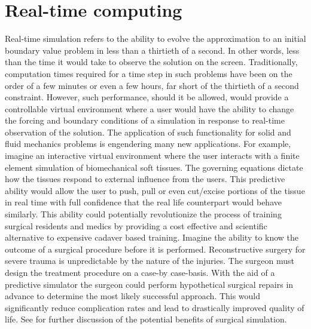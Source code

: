 \section*{Real-time computing}
Real-time simulation refers to the ability to evolve the approximation to an initial boundary value problem in less than a thirtieth of a second. In other words, less than the time it would take to observe the solution on the screen. Traditionally, computation times required for a time step in such problems have been on the order of a few minutes or even a few hours, far short of the thirtieth of a second constraint. However, such performance, should it be allowed, would provide a controllable virtual environment where a user would have the ability to change the forcing and boundary conditions of a simulation in response to real-time observation of the solution. The application of such functionality for solid and fluid mechanics problems is engendering many new applications. For example, imagine an interactive virtual environment where the user interacts with a finite element simulation of biomechanical soft tissues. The governing equations dictate how the tissues respond to external influence from the users. This predictive ability would allow the user to push, pull or even cut/excise portions of the tissue in real time with full confidence that the real life counterpart would behave similarly. This ability could potentially revolutionize the process of training surgical residents and medics by providing a cost effective and scientific alternative to expensive cadaver based training. Imagine the ability to know the outcome of a surgical procedure before it is performed. Reconstructive surgery for severe trauma is unpredictable by the nature of the injuries. The surgeon must design the treatment procedure on a case-by case-basis. With the aid of a predictive simulator the surgeon could perform hypothetical surgical repairs in advance to determine the most likely successful approach. This would significantly reduce complication rates and lead to drastically improved quality of life. See \cite{Sifakis09} for further discussion of the potential benefits of surgical simulation.
